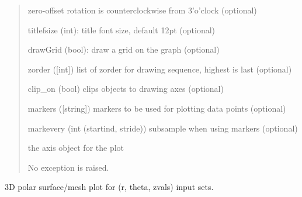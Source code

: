 \documentclass[a4paper,10pt,english]{sphinxmanual}
\begin{document}
\begin{fulllineitems}
\begin{fulllineitems}
\begin{quote}
\begin{description}
\begin{DUlineblock}{0em}
zero-offset rotation is counterclockwise from 3'o'clock (optional)
\item[] titlefsize (int): title font size, default 12pt (optional)
\item[] drawGrid (bool): draw a grid on the graph (optional)
\item[] zorder ({[}int{]}) list of zorder for drawing sequence, highest is last (optional)
\item[] clip\_on (bool) clips objects to drawing axes (optional)
\item[] markers ({[}string{]}) markers to be used for plotting data points (optional)
\item[] markevery (int \textbar{} (startind, stride)) subsample when using markers (optional)
\end{DUlineblock}

\item[{Returns:}] \leavevmode
\begin{DUlineblock}{0em}
\item[] the axis object for the plot
\end{DUlineblock}

\item[{Raises:}] \leavevmode
\begin{DUlineblock}{0em}
\item[] No exception is raised.
\end{DUlineblock}

\end{description}
\end{quote}

\end{fulllineitems}


\begin{fulllineitems}
\label{ryplot:pyradi.ryplot.Plotter.polar3d}
3D polar surface/mesh plot for (r, theta, zvals) input sets.


\end{fulllineitems}
\end{fulllineitems}
\end{document}
